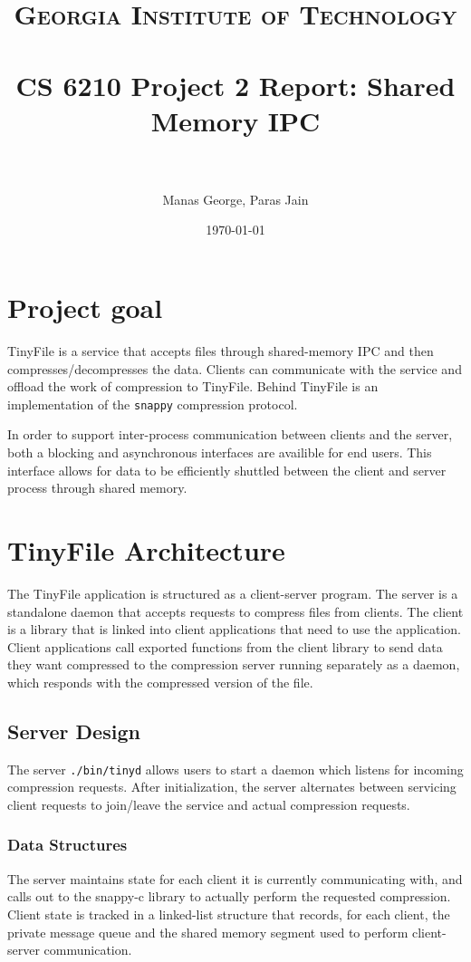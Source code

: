 \documentclass[paper=a4,fontsize=11pt]{report} %
\title{	
\normalfont \normalsize 
\textsc{Georgia Institute of Technology} \\ [25pt] %
\horrule{0.5pt} \\[0.4cm] %
\huge CS 6210 Project 2 Report: Shared Memory IPC \\ %
\horrule{2pt} \\[0.5cm] %
}
\author{Manas George, Paras Jain} %
\date{\normalsize\today} %
\numberwithin{equation}{section} %
\numberwithin{figure}{section} %
\numberwithin{table}{section} %
\begin{document}
\maketitle %

\section{Project goal}
TinyFile is a service that accepts files through shared-memory IPC and then compresses/decompresses the data. Clients can communicate with the service and offload the work of compression to TinyFile. Behind TinyFile is an implementation of the \texttt{snappy} compression protocol.

In order to support inter-process communication between clients and the server, both a blocking and asynchronous interfaces are availible for end users. This interface allows for data to be efficiently shuttled between the client and server process through shared memory.

\section{TinyFile Architecture}
The TinyFile application is structured as a client-server program. The server is a standalone daemon that accepts requests to compress files from clients. The client is a library that is linked into client applications that need to use the application. Client applications call exported functions from the client library to send data they want compressed to the compression server running separately as a daemon, which responds with the compressed version of the file.

\subsection{Server Design}
The server \texttt{./bin/tinyd} allows users to start a daemon which listens for incoming compression requests. After initialization, the server alternates between servicing client requests to join/leave the service and actual compression requests.

\subsubsection{Data Structures}
The server maintains state for each client it is currently communicating with, and calls out to the snappy-c library to actually perform the requested compression. Client state is tracked in a linked-list structure that records, for each client, the private message queue and the shared memory segment used to perform client-server communication.
\end{document}
